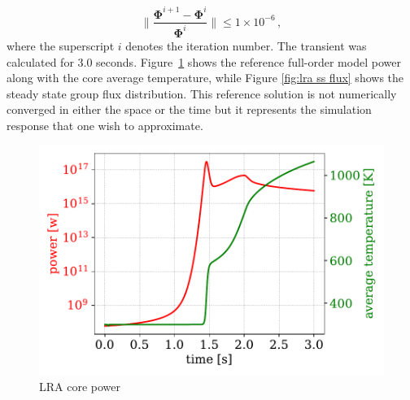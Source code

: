 \documentclass[]{interact}
\theoremstyle{plain}%
\theoremstyle{definition}
\theoremstyle{remark}
\begin{document}
\begin{equation}
\|\frac{\mathbf{\Phi}^{i+1} - \mathbf{\Phi}^{i}} {\mathbf{\Phi}^i}\| \le  1\times 10^{-6} \, , 
\end{equation}
where the superscript $i$ denotes the iteration number.
The transient was calculated for 3.0 seconds.
Figure~\ref{fig:lra fom power} shows the reference full-order model power along with the core average temperature, while Figure \ref{fig:lra ss flux} shows the steady state group flux distribution.
This reference solution is not numerically converged in either the space or the time but it represents the simulation response that one wish to approximate.
\begin{figure}[h!]
	\includegraphics[width=1.0\linewidth]{../figures/LRA_fom_power_temperature.pdf}
	\caption{LRA core power}
	\label{fig:lra fom power}
\end{figure}

\end{document}
